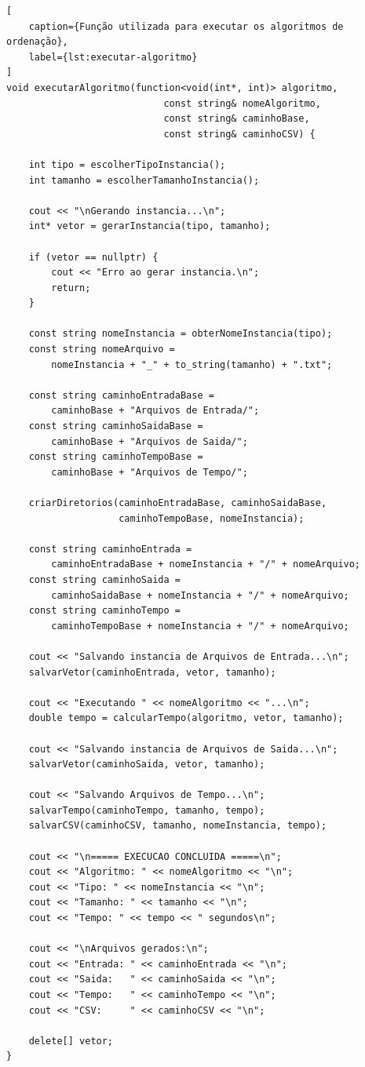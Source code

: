\begin{lstlisting}[
    caption={Função utilizada para executar os algoritmos de ordenação},
    label={lst:executar-algoritmo}
]
void executarAlgoritmo(function<void(int*, int)> algoritmo,
                            const string& nomeAlgoritmo,
                            const string& caminhoBase,
                            const string& caminhoCSV) {

    int tipo = escolherTipoInstancia();
    int tamanho = escolherTamanhoInstancia();

    cout << "\nGerando instancia...\n";
    int* vetor = gerarInstancia(tipo, tamanho);

    if (vetor == nullptr) {
        cout << "Erro ao gerar instancia.\n";
        return;
    }

    const string nomeInstancia = obterNomeInstancia(tipo);
    const string nomeArquivo =
        nomeInstancia + "_" + to_string(tamanho) + ".txt";

    const string caminhoEntradaBase =
        caminhoBase + "Arquivos de Entrada/";
    const string caminhoSaidaBase =
        caminhoBase + "Arquivos de Saida/";
    const string caminhoTempoBase =
        caminhoBase + "Arquivos de Tempo/";

    criarDiretorios(caminhoEntradaBase, caminhoSaidaBase,
                    caminhoTempoBase, nomeInstancia);

    const string caminhoEntrada =
        caminhoEntradaBase + nomeInstancia + "/" + nomeArquivo;
    const string caminhoSaida =
        caminhoSaidaBase + nomeInstancia + "/" + nomeArquivo;
    const string caminhoTempo =
        caminhoTempoBase + nomeInstancia + "/" + nomeArquivo;

    cout << "Salvando instancia de Arquivos de Entrada...\n";
    salvarVetor(caminhoEntrada, vetor, tamanho);

    cout << "Executando " << nomeAlgoritmo << "...\n";
    double tempo = calcularTempo(algoritmo, vetor, tamanho);

    cout << "Salvando instancia de Arquivos de Saida...\n";
    salvarVetor(caminhoSaida, vetor, tamanho);

    cout << "Salvando Arquivos de Tempo...\n";
    salvarTempo(caminhoTempo, tamanho, tempo);
    salvarCSV(caminhoCSV, tamanho, nomeInstancia, tempo);

    cout << "\n===== EXECUCAO CONCLUIDA =====\n";
    cout << "Algoritmo: " << nomeAlgoritmo << "\n";
    cout << "Tipo: " << nomeInstancia << "\n";
    cout << "Tamanho: " << tamanho << "\n";
    cout << "Tempo: " << tempo << " segundos\n";

    cout << "\nArquivos gerados:\n";
    cout << "Entrada: " << caminhoEntrada << "\n";
    cout << "Saida:   " << caminhoSaida << "\n";
    cout << "Tempo:   " << caminhoTempo << "\n";
    cout << "CSV:     " << caminhoCSV << "\n";

    delete[] vetor;
}
\end{lstlisting}

